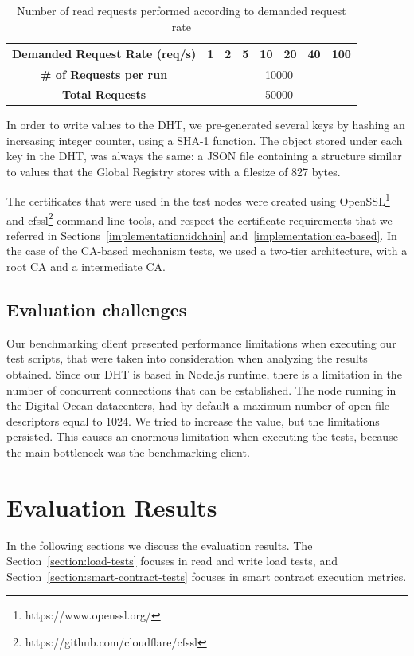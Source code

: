 \begin{table}[htb]
\centering
\begin{tabular}{cccccccc}
  \textbf{Demanded Request Rate (req/s)} & 1 & 2 & 5 & 10 & 20 & 40 & 100 \\ \hline
  \textbf{\# of Requests per run} & \multicolumn{7}{c}{10000} \\ \hline
  \textbf{Total Requests} & \multicolumn{7}{c}{50000} \\ \hline
\end{tabular}
\caption{Number of read requests performed according to demanded request rate}
\label{table:total-requests-demanded-rate-reads}
\end{table}

In order to write values to the DHT, we pre-generated several keys by hashing an increasing integer counter, using a SHA-1 function.
The object stored under each key in the DHT, was always the same: a JSON file containing a structure similar to values that the Global Registry stores with a filesize of 827 bytes.

The certificates that were used in the test nodes were created using OpenSSL\footnote{https://www.openssl.org/} and cfssl\footnote{https://github.com/cloudflare/cfssl} command-line tools, and respect the certificate requirements that we referred in Sections~\ref{implementation:idchain} and~\ref{implementation:ca-based}.
In the case of the CA-based mechanism tests, we used a two-tier architecture, with a root CA and a intermediate CA.

\subsection{Evaluation challenges}

Our benchmarking client presented performance limitations when executing our test scripts, that were taken into consideration when analyzing the results obtained.
Since our DHT is based in Node.js runtime, there is a limitation in the number of concurrent connections that can be established.
The node running in the Digital Ocean datacenters, had by default a maximum number of open file descriptors equal to 1024.
We tried to increase the value, but the limitations persisted.
This causes an enormous limitation when executing the tests, because the main bottleneck was the benchmarking client.

\section{Evaluation Results}
\label{section:results}
In the following sections we discuss the evaluation results.
The Section~\ref{section:load-tests} focuses in read and write load tests, and Section~\ref{section:smart-contract-tests} focuses in smart contract execution metrics.


